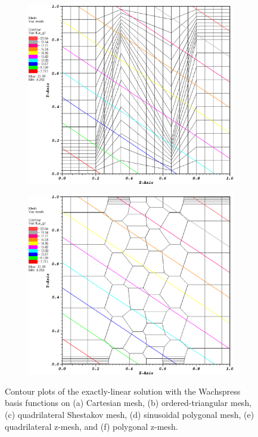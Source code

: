 \begin{figure}
\begin{subfigure}[b]{0.45\textwidth}
		\caption{}
	\end{subfigure}
	\vfill
	\begin{subfigure}[b]{0.45\textwidth}
		\centering
		\label{subfig::z_quad_wach_lin_sol}
		\includegraphics[width=\textwidth]{figures/sec_BF/z_quad_WACHSPRESS_k1.eps}
		\caption{}
	\end{subfigure}
	\hfill
	\begin{subfigure}[b]{0.45\textwidth}
		\centering
		\label{subfig::z_poly_wach_lin_sol}
		\includegraphics[width=\textwidth]{figures/sec_BF/z_poly_WACHSPRESS_k1.eps}
		\caption{}
	\end{subfigure}
\caption{Contour plots of the exactly-linear solution with the Wachspress basis functions on (a) Cartesian mesh, (b) ordered-triangular mesh, (c) quadrilateral Shestakov mesh, (d) sinusoidal polygonal mesh, (e) quadrilateral z-mesh, and (f) polygonal z-mesh.}
\label{fig::BF_Results_Linear_wach_sol}
\end{figure}

